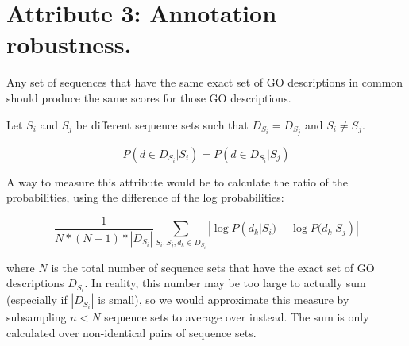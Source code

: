 \documentclass{specification}
\begin{document}

\section*{Attribute 3: Annotation robustness.}

Any set of sequences that have the same exact set of GO descriptions in common should produce the same scores for those GO descriptions.

Let $S_i$ and $S_j$ be different sequence sets such that $D_{S_i} = D_{S_j}$ and $S_i \neq S_j$.

\[P(d \in D_{S_i} | S_i) = P(d \in D_{S_i} | S_j)\]

A way to measure this attribute would be to calculate the ratio of the probabilities, using the difference of the log probabilities: 

\[\frac{1}{N*(N-1)*|D_{S_i}|}\sum_{S_i, S_j, d_{k} \in D_{S_i}} |\log P(d_k | S_i) - \log P(d_k | S_j)|\]

where $N$ is the total number of sequence sets that have the exact set of GO descriptions $D_{S_i}$. In reality, this number may be too large to actually sum (especially if $|D_{S_i}|$ is small), so we would approximate this measure by subsampling $n < N$ sequence sets to average over instead. The sum is only calculated over non-identical pairs of sequence sets.
 
%
%


\end{document}
